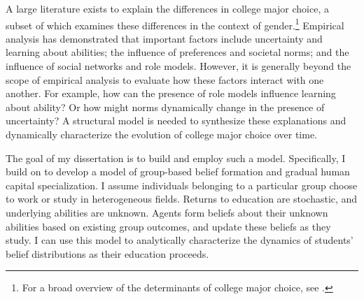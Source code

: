 A large literature exists to explain the differences in college major choice, a subset of which examines these differences in the context of gender.\footnote{
    For a broad overview of the determinants of college major choice, see \textcite{PWZ20}.
}
Empirical analysis has demonstrated that important factors include uncertainty and learning about abilities; the influence of preferences and societal norms; and the influence of social networks and role models.
However, it is generally beyond the scope of empirical analysis to evaluate how these factors interact with one another.
For example, how can the presence of role models influence learning about ability?
Or how might norms dynamically change in the presence of uncertainty?
A structural model is needed to synthesize these explanations and dynamically characterize the evolution of college major choice over time.


The goal of my dissertation is to build and employ such a model. 
Specifically, I build on \textcite{AF20} to develop a model of group-based belief formation and gradual human capital specialization. 
I assume individuals belonging to a particular group choose to work or study in heterogeneous fields. 
Returns to education are stochastic, and underlying abilities are unknown.
Agents form beliefs about their unknown abilities based on existing group outcomes, and update these beliefs as they study.
I can use this model to analytically characterize the dynamics of students' belief distributions as their education proceeds.
 
